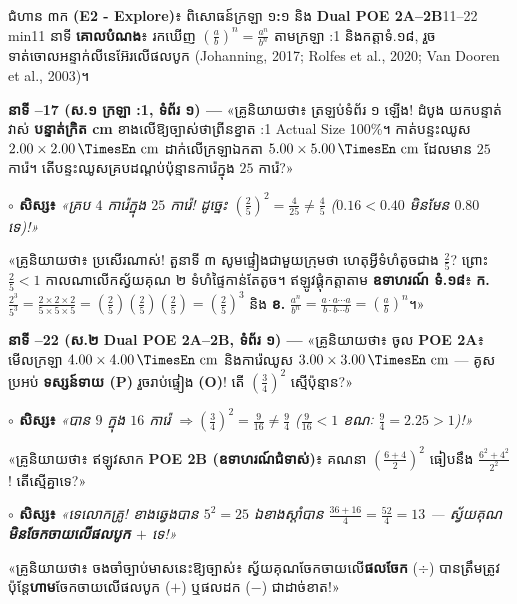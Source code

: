 \documentclass[a4paper,12pt]{article}
\newcommand{\en}[1]{{\TimesEn #1}}
\newcommand{\enbf}[1]{{\TimesEn\textbf{#1}}}
\newcommand{\unit}[1]{\,\text{\en{#1}}}
\newcommand{\teachersays}[1]{{\muol\fontsize{10.8pt}{17pt}\selectfont «គ្រូនិយាយថា៖} #1»}
\begin{document}
\Needspace{2.0cm}
\begin{phasebox}{ជំហាន ៣ក \enbf{(E2 - Explore)}៖ ពិសោធន៍ក្រឡា ១\enbf{:}១ និង \enbf{Dual POE 2A--2B}}{11--22 min}{11 នាទី}
\textbf{គោលបំណង}៖ រកឃើញ $\left(\frac{a}{b}\right)^n = \frac{a^n}{b^n}$ តាមក្រឡា \en{1:1} និងកត្តាទំ.១៨, រួចទាត់ចោលអន្ទាក់លីនេអ៊ែរលើផលបូក \en{(Johanning, 2017; Rolfes et al., 2020; Van Dooren et al., 2003)}។
\end{phasebox}
\begin{scriptbox}
  \textbf{នាទី \en{11--17} (ស.១ ក្រឡា \en{1:1}, ទំព័រ ១) — }\teachersays{ត្រឡប់ទំព័រ ១ ឡើង! ដំបូង យកបន្ទាត់វាស់ \textbf{បន្ទាត់ក្រិត \en{5.00 cm}} ខាងលើឱ្យច្បាស់ថាព្រីនខ្នាត \en{1:1 Actual Size 100\%}។ កាត់បន្ទះឈូស $2.00\times 2.00\unit{cm}$ ដាក់លើក្រឡាឯកតា $5.00\times 5.00\unit{cm}$ ដែលមាន $25$ ការ៉េ។ តើបន្ទះឈូសគ្របដណ្ដប់ប៉ុន្មានការ៉េក្នុង $25$ ការ៉េ?}\par\vspace{2pt}
  \textbf{$\circ$ សិស្ស៖} \textit{«គ្រប $4$ ការ៉េក្នុង $25$ ការ៉េ! ដូច្នេះ $\left(\frac{2}{5}\right)^2 = \frac{4}{25} \neq \frac{4}{5}$ ($0.16 < 0.40$ មិនមែន $0.80$ ទេ)!»}\par\vspace{2pt}
  \teachersays{ប្រសើរណាស់! តួនាទី ៣ សូមផ្ទៀងជាមួយក្រុមថា ហេតុអ្វីទំហំតូចជាង $\frac{2}{5}$? ព្រោះ $\frac{2}{5}<1$ កាលណាលើកស្វ័យគុណ ២ ទំហំផ្ទៃកាន់តែតូច។ ឥឡូវផ្គុំកត្តាតាម \textbf{ឧទាហរណ៍ ទំ.១៨}៖ \textbf{ក.} $\frac{2^3}{5^3} = \frac{2\times 2\times 2}{5\times 5\times 5} = \left(\frac{2}{5}\right)\left(\frac{2}{5}\right)\left(\frac{2}{5}\right) = \left(\frac{2}{5}\right)^3$ និង \textbf{ខ.} $\frac{a^n}{b^n} = \frac{a\cdot a\cdots a}{b\cdot b\cdots b} = \left(\frac{a}{b}\right)^n$។}\par\vspace{3pt}
  \textbf{នាទី \en{17--22} (ស.២ \en{Dual POE 2A--2B}, ទំព័រ ១) — }\teachersays{ចូល \textbf{\en{POE 2A}}៖ មើលក្រឡា $4.00\times 4.00\unit{cm}$ និងការ៉េឈូស $3.00\times 3.00\unit{cm}$ — គូសប្រអប់ \textbf{ទស្សន៍ទាយ (\en{P})} រួចរាប់ផ្ទៀង \textbf{(\en{O})}! តើ $\left(\frac{3}{4}\right)^2$ ស្មើប៉ុន្មាន?}\par\vspace{2pt}
  \textbf{$\circ$ សិស្ស៖} \textit{«បាន $9$ ក្នុង $16$ ការ៉េ $\Rightarrow \left(\frac{3}{4}\right)^2 = \frac{9}{16} \neq \frac{9}{4}$ ($\frac{9}{16}<1$ ខណៈ $\frac{9}{4}=2.25>1$)!»}\par\vspace{2pt}
  \teachersays{ឥឡូវសាក \textbf{\en{POE 2B} (ឧទាហរណ៍ជំទាស់)}៖ គណនា $\left(\frac{6+4}{2}\right)^2$ ធៀបនឹង $\frac{6^2+4^2}{2^2}$! តើស្មើគ្នាទេ?}\par\vspace{2pt}
  \textbf{$\circ$ សិស្ស៖} \textit{«ទេលោកគ្រូ! ខាងឆ្វេងបាន $5^2=25$ ឯខាងស្ដាំបាន $\frac{36+16}{4}=\frac{52}{4}=13$ — ស្វ័យគុណ\textbf{មិនចែកចាយលើផលបូក $+$} ទេ!»}\par\vspace{2pt}
  \teachersays{ចងចាំច្បាប់មាសនេះឱ្យច្បាស់៖ ស្វ័យគុណចែកចាយលើ\textbf{ផលចែក} ($\div$) បានត្រឹមត្រូវ ប៉ុន្តែ\textbf{ហាម}ចែកចាយលើផលបូក ($+$) ឬផលដក ($-$) ជាដាច់ខាត!}
\end{scriptbox}
\end{document}
